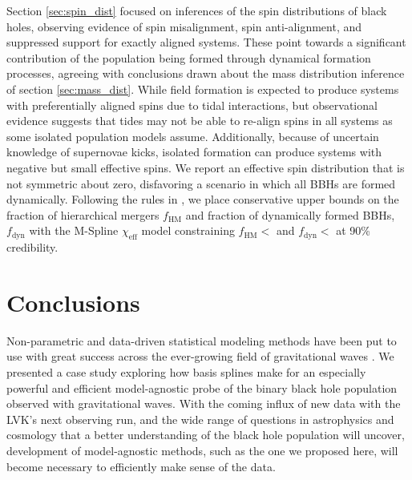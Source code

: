 Section \ref{sec:spin_dist} focused on inferences of the spin distributions of black holes, observing evidence of spin misalignment, spin anti-alignment, and suppressed support 
for exactly aligned systems. These point towards a significant contribution of the population being formed through dynamical formation processes, agreeing with 
conclusions drawn about the mass distribution inference of section \ref{sec:mass_dist}. While field formation is expected to produce systems with preferentially 
aligned spins due to tidal interactions, but observational evidence suggests that tides may not be able to re-align spins in all systems as some 
isolated population models assume. Additionally, because of uncertain knowledge of supernovae kicks, isolated formation can produce systems with negative but small effective spins. 
We report an effective spin distribution that is not symmetric about zero, disfavoring a scenario in which all BBHs are formed dynamically. Following the rules in \citet{Fishbach_2022}, 
we place conservative upper bounds on the fraction of hierarchical mergers $f_\mathrm{HM}$ and fraction of dynamically formed BBHs, $f_\mathrm{dyn}$ with 
the M-Spline $\chi_\mathrm{eff}$ model constraining $f_\mathrm{HM} < $\result{$\macros[ChiEffective][chieff][frac_hm][10th percentile]$} 
and $f_\mathrm{dyn} < $ at 90\% credibility. 

\section{Conclusions}\label{sec:conclusion}

Non-parametric and data-driven statistical modeling methods have been put to use with great success across the ever-growing field of gravitational 
waves \citep{B_Farr_etal_2014,Littenberg_2015,Mandel_2016,Edwards_2018,Doctor_GPR,Edelman_2021,Vitale_2021,Tiwari_2021_a,Tiwari_2021_b,Edelman_2022ApJ,Tiwari_2022ApJ}. 
We presented a case study exploring how basis splines make for an especially powerful and efficient model-agnostic probe of the binary black hole population observed 
with gravitational waves. With the coming influx of new data with the LVK's next observing run, and the wide range of questions in astrophysics and cosmology that a better 
understanding of the black hole population will uncover, development of model-agnostic methods, such as the one we proposed here, will become necessary to efficiently make
sense of the data.  
